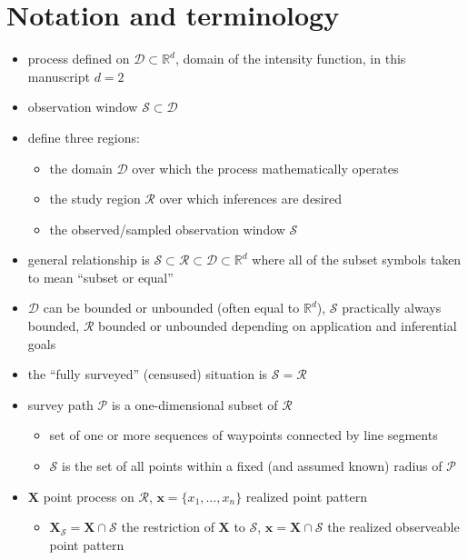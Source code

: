 \documentclass[review]{elsarticle}
\begin{document}
\section{Notation and terminology}

\begin{itemize}

\item process defined on \(\mathcal{D} \subset \mathbb{R}^{d}\), domain of the
intensity function, in this manuscript \(d = 2\)

\item observation window \(\mathcal{S} \subset \mathcal{D}\)

\item define three regions:
\begin{itemize}
\item the domain \(\mathcal{D}\) over which the process mathematically operates
\item the study region \(\mathcal{R}\) over which inferences are desired
\item the observed/sampled observation window \(\mathcal{S}\)
\end{itemize}

\item general relationship is \(\mathcal{S} \subset \mathcal{R}
\subset \mathcal{D} \subset \mathbb{R}^{d}\) where all of the subset symbols
taken to mean ``subset or equal''

\item \(\mathcal{D}\) can be bounded or unbounded (often equal to
\(\mathbb{R}^{d}\)), $\mathcal{S}$ practically always bounded, \(\mathcal{R}\)
bounded or unbounded depending on application and inferential goals

\item the ``fully surveyed'' (censused) situation is
\(\mathcal{S} = \mathcal{R}\)

\item survey path \(\mathcal{P}\) is a one-dimensional subset of
\(\mathcal{R}\)
\begin{itemize}
\item set of one or more sequences of waypoints connected by line segments
\item \(\mathcal{S}\) is the set of all points within a fixed (and assumed
known) radius of \(\mathcal{P}\)
\end{itemize}

\item \(\mathbf{X}\) point process on \(\mathcal{R}\), \(\mathbf{x} = \{x_{1},
\dots, x_{n}\}\) realized point pattern
\begin{itemize}
\item \(\mathbf{X}_{\mathcal{S}} = \mathbf{X} \cap \mathcal{S}\) the
 restriction of \(\mathbf{X}\) to \(\mathcal{S}\), \(\mathbf{x} = \mathbf{X}
\cap \mathcal{S}\) the realized observeable point pattern
\end{itemize}


\end{itemize}
\end{document}
